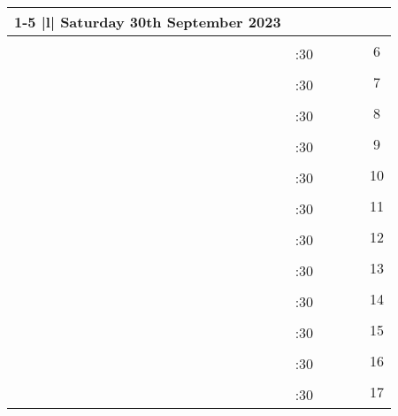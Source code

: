 \documentclass[10pt, a5paper, final, oneside]{memoir}
\newcommand{\grayline}{\arrayrulecolor{lightgray}\cline{1-5}\arrayrulecolor{black}}
\begin{document}
\newpage

\noindent
\begin{tabularx}{\linewidth}{|c|c|X|X|X|c}

    \cline{1-5}
    \multicolumn{5} {|l|} {Saturday 30th September 2023} \\
    \hline

    & & & && \multirow{2}{*}{6}\\ 
    \grayline
    & :30 & & &&\\ \hline

    & & & && \multirow{2}{*}{7}\\ 
    \grayline
    & :30 & & &&\\ \hline

    & & & && \multirow{2}{*}{8}\\ 
    \grayline
    & :30 & & &&\\ \hline

    & & & && \multirow{2}{*}{9}\\ 
    \grayline
    & :30 & & &&\\ \hline
    
    & & & && \multirow{2}{*}{10}\\ 
    \grayline
    & :30 & & &&\\ \hline

    & & & && \multirow{2}{*}{11}\\ 
    \grayline
    & :30 & & &&\\ \hline

    & & & && \multirow{2}{*}{12}\\ 
    \grayline
    & :30 & & &&\\ \hline

    & & & && \multirow{2}{*}{13}\\ 
    \grayline
    & :30 & & &&\\ \hline

    & & & && \multirow{2}{*}{14}\\ 
    \grayline
    & :30 & & &&\\ \hline
    
    & & & && \multirow{2}{*}{15}\\ 
    \grayline
    & :30 & & &&\\ \hline

    & & & && \multirow{2}{*}{16}\\ 
    \grayline
    & :30 & & &&\\ \hline

    & & & && \multirow{2}{*}{17}\\ 
    \grayline
    & :30 & & &&\\ \hline


\end{tabularx}
\end{document}

